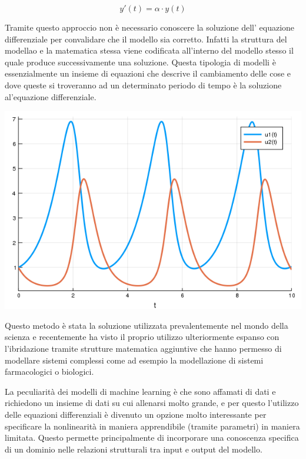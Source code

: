 $$y'(t) = \alpha \cdot y(t)$$

Tramite questo approccio non è necessario conoscere la soluzione dell'
equazione differenziale per convalidare che il modello sia corretto. Infatti 
la struttura del modellao e la matematica stessa viene codificata all'interno 
del modello stesso  il quale produce successivamente una soluzione. Questa 
tipologia di modelli è essenzialmente un insieme di equazioni che descrive 
il cambiamento delle cose e dove queste si troveranno ad un determinato periodo di tempo
è la soluzione al'equazione differenziale.

\begin{minipage}{\linewidth}
    \centering
    \includegraphics[width=\textwidth]{img/lotkavolterra.png}
    \label{fig:lotkavolterra_example}
\end{minipage}

Questo metodo è stata la soluzione utilizzata prevalentemente nel mondo 
della scienza e recentemente ha visto il proprio utilizzo ulteriormente 
espanso con l'ibridazione tramite strutture matematica aggiuntive che 
hanno permesso di modellare sistemi complessi come ad esempio la modellazione 
di sistemi farmacologici o biologici.

La peculiarità dei modelli di machine learning è che sono affamati di dati 
e richiedono un insieme di dati su cui allenarsi molto grande, e per questo 
l'utilizzo delle equazioni differenziali è divenuto un opzione molto 
interessante per specificare la nonlinearità in maniera apprendibile
(tramite parametri) in maniera limitata. Questo permette principalmente di 
incorporare una conoscenza specifica di un dominio nelle relazioni strutturali 
tra input e output del modello. 

